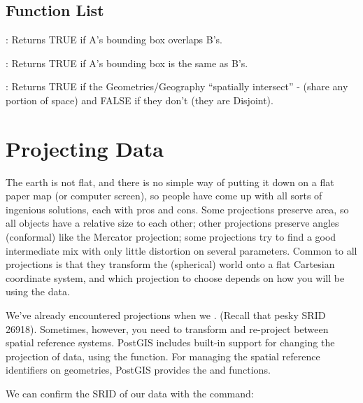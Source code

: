 \documentclass[a4paper,11pt,english]{sphinxmanual}
\begin{document}
\subsection{Function List}
\label{\detokenize{basic:id20}}
: Returns TRUE if A’s bounding box overlaps B’s.

: Returns TRUE if A’s bounding box is the same as B’s.

: Returns TRUE if the Geometries/Geography “spatially intersect” - (share any portion of space) and FALSE if they don’t (they are Disjoint).


\section{Projecting Data}
\label{\detokenize{basic:projecting-data}}\label{\detokenize{basic:projection}}
The earth is not flat, and there is no simple way of putting it down on a flat paper map (or computer screen), so people have come up with all sorts of ingenious solutions, each with pros and cons. Some projections preserve area, so all objects have a relative size to each other; other projections preserve angles (conformal) like the Mercator projection; some projections try to find a good intermediate mix with only little distortion on several parameters. Common to all projections is that they transform the (spherical) world onto a flat Cartesian coordinate system, and which projection to choose depends on how you will be using the data.

We’ve already encountered projections when we .  (Recall that pesky SRID 26918).  Sometimes, however, you need to transform and re-project between spatial reference systems. PostGIS includes built-in support for changing the projection of data, using the  function. For managing the spatial reference identifiers on geometries, PostGIS provides the  and  functions.

We can confirm the SRID of our data with the  command:
\end{document}
